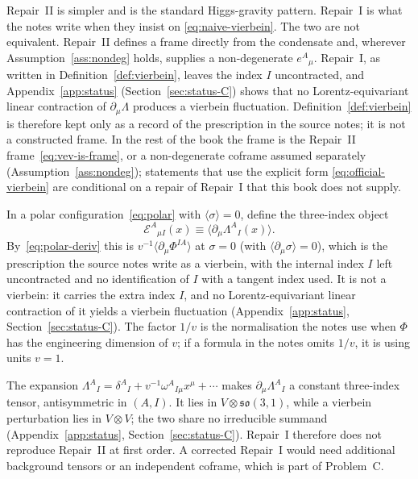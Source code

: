Repair~II is simpler and is the standard Higgs-gravity pattern.
Repair~I is what the notes write when they insist on
\eqref{eq:naive-vierbein}. The two are not equivalent. Repair~II
defines a frame directly from the condensate and, wherever
Assumption~\ref{ass:nondeg} holds, supplies a non-degenerate
\(e^A{}_\mu\). Repair~I, as written in
Definition~\ref{def:vierbein}, leaves the index \(I\) uncontracted,
and Appendix~\ref{app:status} (Section~\ref{sec:status-C}) shows that no
Lorentz-equivariant linear contraction of \(\partial_\mu\Lambda\)
produces a vierbein fluctuation. Definition~\ref{def:vierbein} is
therefore kept only as a record of the prescription in the source
notes; it is not a constructed frame. In the rest of the book the
frame is the Repair~II frame~\eqref{eq:vev-is-frame}, or a
non-degenerate coframe assumed separately
(Assumption~\ref{ass:nondeg}); statements that use the explicit form
\eqref{eq:official-vierbein} are conditional on a repair of Repair~I
that this book does not supply.

\begin{definition}
  \label{def:vierbein}
  In a polar configuration~\eqref{eq:polar} with
  \(\langle\sigma\rangle=0\), define the three-index object
  \begin{equation}
    \label{eq:official-vierbein}
    \mathcal{E}^{A}{}_{\mu I}(x)
    \equiv
    \bigl\langle\partial_\mu\Lambda^{A}{}_I(x)\bigr\rangle .
  \end{equation}
  By~\eqref{eq:polar-deriv} this is
  \(v^{-1}\langle\partial_\mu\Phi^{IA}\rangle\) at \(\sigma=0\)
  (with \(\langle\partial_\mu\sigma\rangle=0\)), which is the
  prescription the source notes write as a vierbein, with the
  internal index \(I\) left uncontracted and no identification of
  \(I\) with a tangent index used. It is not a vierbein: it carries
  the extra index \(I\), and no Lorentz-equivariant linear contraction
  of it yields a vierbein fluctuation (Appendix~\ref{app:status},
  Section~\ref{sec:status-C}). The factor \(1/v\) is the normalisation
  the notes use when \(\Phi\) has the engineering dimension of \(v\);
  if a formula in the notes omits \(1/v\), it is using units \(v=1\).
\end{definition}

\begin{remark}
The expansion
\(\Lambda^A{}_I=\delta^A{}_I+v^{-1}\omega^A{}_{I\mu}x^\mu+\cdots\)
makes \(\partial_\mu\Lambda^A{}_I\) a constant three-index tensor,
antisymmetric in \((A,I)\). It lies in
\(V\otimes\mathfrak{so}(3,1)\), while a vierbein perturbation lies
in \(V\otimes V\); the two share no irreducible summand
(Appendix~\ref{app:status}, Section~\ref{sec:status-C}). Repair~I
therefore does not reproduce Repair~II at first order. A
corrected Repair~I would need additional background tensors or an
independent coframe, which is part of Problem~C.
\end{remark}

